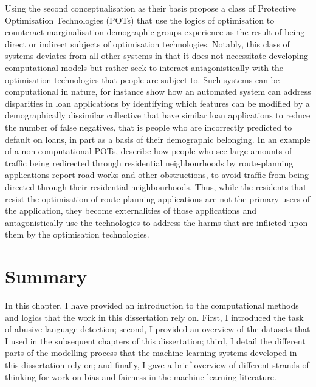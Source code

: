 Using the second conceptualisation as their basis \citet{Kulynych:2020} propose a class of Protective Optimisation Technologies (POTs) that use the logics of optimisation to counteract marginalisation demographic groups experience as the result of being direct or indirect subjects of optimisation technologies.
Notably, this class of systems deviates from all other systems in that it does not necessitate developing computational models but rather seek to interact antagonistically with the optimisation technologies that people are subject to.
Such systems can be computational in nature, for instance \citet{Kulynych:2020} show how an automated system can address disparities in loan applications by identifying which features can be modified by a demographically dissimilar collective that have similar loan applications to reduce the number of false negatives, that is people who are incorrectly predicted to default on loans, in part as a basis of their demographic belonging.
In an example of a non-computational POTs, \citet{Kulynych:2020} describe how people who see large amounts of traffic being redirected through residential neighbourhoods by route-planning applications report road works and other obstructions, to avoid traffic from being directed through their residential neighbourhoods. 
Thus, while the residents that resist the optimisation of route-planning applications are not the primary users of the application, they become externalities of those applications and antagonistically use the technologies to address the harms that are inflicted upon them by the optimisation technologies.


\section{Summary}

In this chapter, I have provided an introduction to the computational methods and logics that the work in this dissertation rely on. 
First, I introduced the task of abusive language detection; second, I provided an overview of the datasets that I used in the subsequent chapters of this dissertation; third, I detail the different parts of the modelling process that the machine learning systems developed in this dissertation rely on; and finally, I gave a brief overview of different strands of thinking for work on bias and fairness in the machine learning literature.
